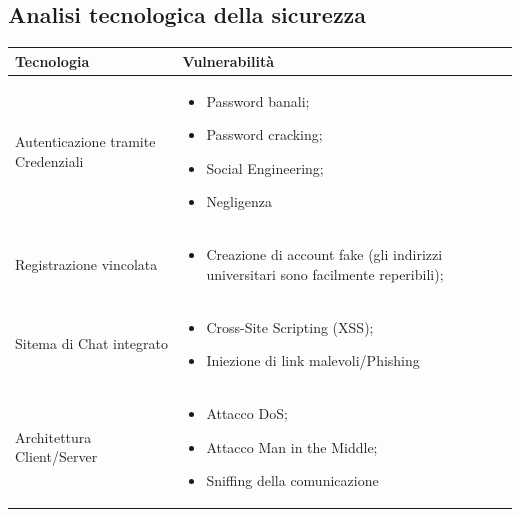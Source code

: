 \documentclass[12pt,a4paper]{report}
\begin{document}
\subsection{Analisi tecnologica della sicurezza}
\begin{tabularx}{\textwidth}{|X|X|}
    \hline
    \rowcolor{studyColor} \textbf{Tecnologia} & \textbf{Vulnerabilità} \\ \hline
    \endhead
    Autenticazione tramite Credenziali & \begin{itemize}[nosep, leftmargin=*]
                    \item Password banali;
                    \item Password cracking;
                    \item Social Engineering;
                    \item Negligenza
                \end{itemize} \\ \hline
    Registrazione vincolata & \begin{itemize}[nosep, leftmargin=*]
                    \item Creazione di account fake (gli indirizzi universitari sono facilmente reperibili);
                \end{itemize} \\ \hline
    Sitema di Chat integrato & \begin{itemize}[nosep, leftmargin=*]
                    \item Cross-Site Scripting (XSS);
                    \item Iniezione di link malevoli/Phishing
                \end{itemize} \\ \hline
    Architettura Client/Server & \begin{itemize}[nosep, leftmargin=*]
                    \item Attacco DoS;
                    \item Attacco Man in the Middle;
                    \item Sniffing della comunicazione
                \end{itemize} \\ \hline


\end{tabularx}
\end{document}

